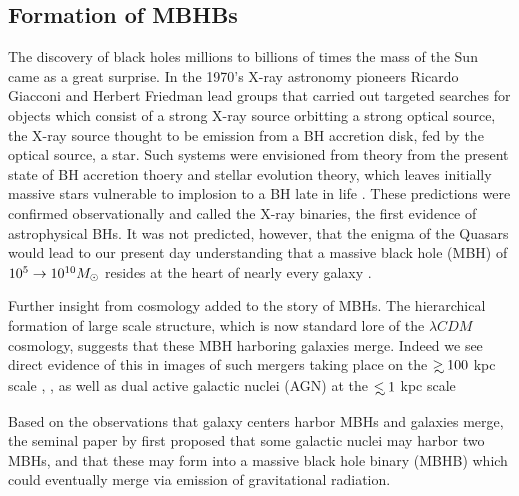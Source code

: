\subsection{Formation of MBHBs}     The discovery of black holes millions to
billions of times the mass of the Sun came as a great surprise. In the 1970's
X-ray astronomy pioneers Ricardo Giacconi and Herbert Friedman lead groups
that carried out targeted searches for objects which consist of a strong X-ray
source orbitting a strong optical source, the X-ray source thought to be
emission from a BH accretion disk, fed by the optical source, a star. Such
systems were envisioned from theory from the present state of BH accretion
thoery and stellar evolution theory, which leaves initially massive stars
vulnerable to implosion to a BH late in life 
\citep[an entertaining historical account is found in][]{ThorneBHsTimeWarps:CH8}. 
These predictions were confirmed
observationally and called the X-ray binaries, the first evidence of
astrophysical BHs. It was not predicted, however, that the enigma of the
Quasars \citep[\emph{e.g.}][]{Schmidt:1963, Salpeter:1964, LyndenBell:1969}
would lead to our present day understanding that a massive black hole (MBH) of
$10^5 \rightarrow 10^{10} {M_{\odot}}$ resides at the heart of nearly every galaxy
\citep{kr95, KormendyHo2013, ff05}.

Further insight from cosmology added to the story of MBHs. The hierarchical
formation of large scale structure, which is now standard lore of the $\lambda
CDM$ cosmology, suggests that these MBH harboring galaxies merge.
Indeed we see direct evidence of this in images of such mergers taking place
on the $\gsim 100$ kpc scale \citep{Comerford:2013}, \citep[see also][and
references therein]{Dotti:2012:rev}, as well as dual active galactic nuclei
(AGN) at the $\lsim 1$ kpc scale \citep{Komossa:2003, Fabbiano+2011,Rodriguez:2006, BurkeSpolaor:2011, ColpiDotti:2011:rev, Gitti:2013, Woo:subKpcBin:2014,
AndradeSantos:2016}



Based on the observations that galaxy centers harbor MBHs and galaxies merge,
the seminal paper by \cite{Begel:Blan:Rees:1980} first proposed that some
galactic nuclei may harbor two MBHs, and that these may form into a massive
black hole binary (MBHB) which could eventually merge via emission of
gravitational radiation.

